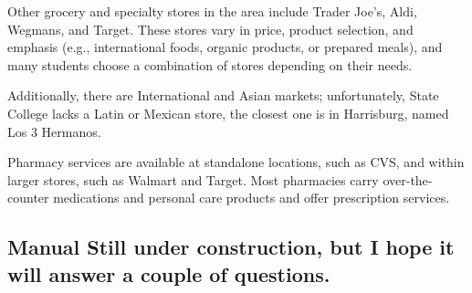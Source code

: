\documentclass[11pt, oneside]{article}   	%
\begin{document}
Other grocery and specialty stores in the area include Trader Joe’s, Aldi, Wegmans, and Target. These stores vary in price, product selection, and emphasis (e.g., international foods, organic products, or prepared meals), and many students choose a combination of stores depending on their needs.

Additionally, there are International and Asian markets; unfortunately, State College lacks a Latin or Mexican store, the closest one is in Harrisburg, named Los 3 Hermanos.

Pharmacy services are available at standalone locations, such as CVS, and within larger stores, such as Walmart and Target. Most pharmacies carry over-the-counter medications and personal care products and offer prescription services.

\subsection{Manual Still under construction, but I hope it will answer a couple of questions.}
\end{document}
